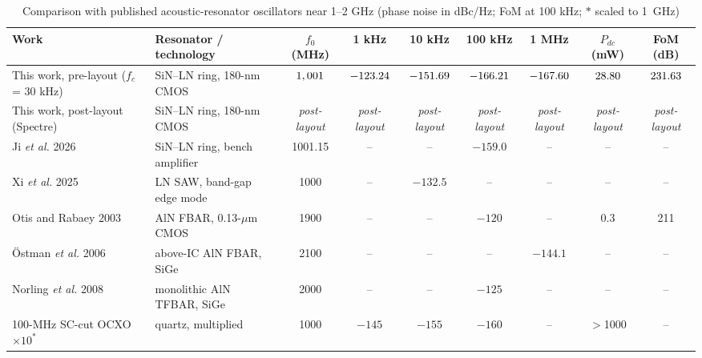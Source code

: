 \documentclass[journal]{IEEEtran}
\newcommand{\dBc}{dBc/Hz}
\newcommand{\tbd}{\textit{post-layout}}
\begin{document}
\begin{table}[!t]
\caption{Comparison with published acoustic-resonator oscillators near 1--2 GHz (phase noise in \dBc; FoM at 100 kHz; $\ast$ scaled to 1~GHz)}
\label{tab:cmp}
\centering
\footnotesize
\setlength{\tabcolsep}{4pt}
\begin{tabular}{@{}llccccccc@{}}
\toprule
Work & Resonator / technology & $f_0$ (MHz) & 1 kHz & 10 kHz & 100 kHz & 1 MHz & $P_{dc}$ (mW) & FoM (dB)\\
\midrule
This work, pre-layout ($f_c$ = 30 kHz) & SiN--LN ring, 180-nm CMOS & $1,001$ & $-123.24$ & $-151.69$ & $-166.21$ & $-167.60$ & $28.80$ & $231.63$\\
This work, post-layout (Spectre) & SiN--LN ring, 180-nm CMOS & \tbd & \tbd & \tbd & \tbd & \tbd & \tbd & \tbd\\
Ji \textit{et al.} 2026 \cite{ji2026} & SiN--LN ring, bench amplifier & 1001.15 & -- & -- & $-159.0$ & -- & -- & --\\
Xi \textit{et al.} 2025 \cite{xi2025} & LN SAW, band-gap edge mode & 1000 & -- & $-132.5$ & -- & -- & -- & --\\
Otis and Rabaey 2003 \cite{otis2003} & AlN FBAR, 0.13-$\mu$m CMOS & 1900 & -- & -- & $-120$ & -- & 0.3 & 211\\
\"Ostman \textit{et al.} 2006 \cite{ostman2006} & above-IC AlN FBAR, SiGe & 2100 & -- & -- & -- & $-144.1$ & -- & --\\
Norling \textit{et al.} 2008 \cite{norling2008} & monolithic AlN TFBAR, SiGe & 2000 & -- & -- & $-125$ & -- & -- & --\\
100-MHz SC-cut OCXO $\times10^\ast$ \cite{rubiola2009} & quartz, multiplied & 1000 & $-145$ & $-155$ & $-160$ & -- & $>$1000 & --\\
\bottomrule
\end{tabular}
\end{table}
\end{document}
